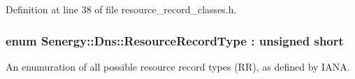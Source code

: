 Definition at line 38 of file resource\-\_\-record\-\_\-classes.\-h.

\hypertarget{namespace_senergy_1_1_dns_a590bfd748c955364770f5ce358d9dfe0}{
\subsubsection[{Resource\-Record\-Type}]{\setlength{\rightskip}{0pt plus 5cm}enum {\bf Senergy\-::\-Dns\-::\-Resource\-Record\-Type} \-: unsigned short\hspace{0.3cm}{\ttfamily [strong]}}}\label{namespace_senergy_1_1_dns_a590bfd748c955364770f5ce358d9dfe0}


An enumuration of all possible resource record types (R\-R), as defined by I\-A\-N\-A. 

